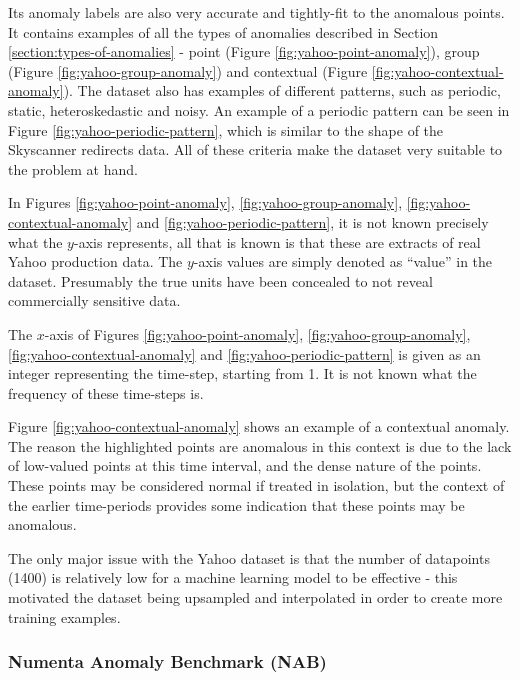 \documentclass{mpaper}
\begin{document}
Its anomaly labels are also very accurate and tightly-fit to the anomalous points. It contains examples of all the types of anomalies described in Section \ref{section:types-of-anomalies} - point (Figure \ref{fig:yahoo-point-anomaly}), group (Figure \ref{fig:yahoo-group-anomaly}) and contextual (Figure \ref{fig:yahoo-contextual-anomaly}). The dataset also has examples of different patterns, such as periodic, static, heteroskedastic and noisy. An example of a periodic pattern can be seen in Figure \ref{fig:yahoo-periodic-pattern}, which is similar to the shape of the Skyscanner redirects data. All of these criteria make the dataset very suitable to the problem at hand.

In Figures \ref{fig:yahoo-point-anomaly}, \ref{fig:yahoo-group-anomaly}, \ref{fig:yahoo-contextual-anomaly} and \ref{fig:yahoo-periodic-pattern}, it is not known precisely what the $y$-axis represents, all that is known is that these are extracts of real Yahoo production data. The $y$-axis values are simply denoted as ``value'' in the dataset. Presumably the true units have been concealed to not reveal commercially sensitive data.

The $x$-axis of Figures \ref{fig:yahoo-point-anomaly}, \ref{fig:yahoo-group-anomaly}, \ref{fig:yahoo-contextual-anomaly} and \ref{fig:yahoo-periodic-pattern} is given as an integer representing the time-step, starting from 1. It is not known what the frequency of these time-steps is.

Figure \ref{fig:yahoo-contextual-anomaly} shows an example of a contextual anomaly. The reason the highlighted points are anomalous in this context is due to the lack of low-valued points at this time interval, and the dense nature of the points. These points may be considered normal if treated in isolation, but the context of the earlier time-periods provides some indication that these points may be anomalous.

The only major issue with the Yahoo dataset is that the number of datapoints (1400) is relatively low for a machine learning model to be effective - this motivated the dataset being upsampled and interpolated in order to create more training examples.


\subsubsection{Numenta Anomaly Benchmark (NAB)}

\begin{figure}[h]
	\graphicspath{{../code/notebooks/02_Sample_Dataset_Figures_output/}}
	\begin{floatrow}
	\end{floatrow}
\end{figure}
\end{document}
